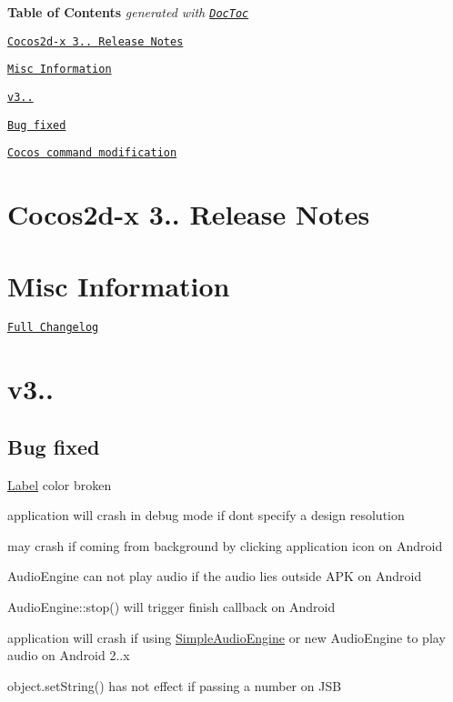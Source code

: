 {\bfseries Table of Contents} {\itshape generated with \href{https://github.com/thlorenz/doctoc}{\tt Doc\+Toc}}


\begin{DoxyItemize}
\item \href{#cocos2d-x-3131-release-notes}{\tt Cocos2d-\/x 3.. Release Notes}
\item \href{#misc-information}{\tt Misc Information}
\item \href{#v3131}{\tt v3..}
\begin{DoxyItemize}
\item \href{#bug-fixed}{\tt Bug fixed}
\item \href{#cocos-command-modification}{\tt Cocos command modification}
\end{DoxyItemize}
\end{DoxyItemize}

\section*{Cocos2d-\/x 3.. Release Notes}

\section*{Misc Information}


\begin{DoxyItemize}
\item \href{https://github.com/cocos2d/cocos2d-x/blob/v3/CHANGELOG}{\tt Full Changelog}
\end{DoxyItemize}

\section*{v3..}

\subsection*{Bug fixed}


\begin{DoxyItemize}
\item \hyperlink{classLabel}{Label} color broken
\item application will crash in debug mode if don\textquotesingle{}t specify a design resolution
\item may crash if coming from background by clicking application icon on Android
\item Audio\+Engine can not play audio if the audio lies outside A\+PK on Android
\item Audio\+Engine\+::stop() will trigger {\ttfamily finish} callback on Android
\item application will crash if using \hyperlink{interfaceSimpleAudioEngine}{Simple\+Audio\+Engine} or new Audio\+Engine to play audio on Android 2..\+x
\item object.\+set\+String() has not effect if passing a number on J\+SB
\end{DoxyItemize}

